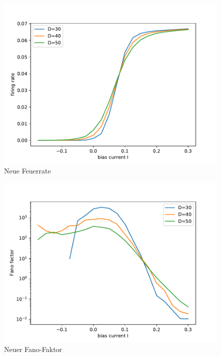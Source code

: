 \documentclass[12pt,a4paper]{article}
\begin{document}
\begin{figure}[H]
	\centering
	\includegraphics[scale=0.9]{gneurrealfast3jjem3.pdf}
	\caption{Neue Feuerrate}
	\label{g}
\end{figure}
\begin{figure}[H]
	\centering
	\includegraphics[scale=0.9]{fneurrealfast3jjem3.pdf}
	\caption{Neuer Fano-Faktor}
	\label{fano}
\end{figure}
\end{document}
